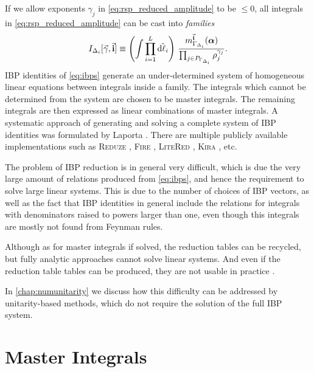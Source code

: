 If we allow exponents $\gamma_j$ in \cref{eq:rsp_reduced_amplitude} to be $\leq0$,
all integrals in \cref{eq:rsp_reduced_amplitude} can be cast into \emph{families}
\begin{equation} \label{eq:integral_families}
    I_{\Delta_i}[\va{\gamma},\va{i}] \equiv 
  \qty(\int \prod_{i=1}^{L} \tilde{\dd{\ell_i}}) ~  
  \frac{m^{\va{i}}_{\Gamma_{\Delta_i}}(\vb*{\alpha})%
    }{\prod_{j\in P_{\Gamma_{\Delta_i}}} \rho_j^{\gamma_{j}}}.
\end{equation}
IBP identities of \cref{eq:ibps} generate an under-determined system of homogeneous linear equations between integrals inside a family.
The integrals which cannot be determined from the system are chosen to be master integrals.
The remaining integrals are then expressed as linear combinations of master integrals.
A systematic approach of generating and solving a complete system of IBP identities was formulated by Laporta \cite{Laporta:2001dd}.
There are multiple publicly available implementations such as
\textsc{Reduze} \cite{Studerus:2009ye,vonManteuffel:2012np},
\textsc{Fire} \cite{Smirnov:2008iw,Smirnov:2014hma},
\textsc{LiteRed} \cite{Lee:2012cn,Lee:2013mka},
\textsc{Kira} \cite{Maierhoefer:2017hyi,Maierhofer:2018gpa}, etc.

The problem of IBP reduction is in general very difficult, which
is due the very large amount of relations produced from \cref{eq:ibps}, and
hence the requirement to solve large linear systems.
This is due to the number of choices of IBP vectors, as well as the fact that IBP identities
in general include the relations for integrals with denominators raised to powers larger than one, even
though this integrals are mostly not found from Feynman rules.

Although as for master integrals if solved, the reduction tables can be recycled, but fully analytic approaches cannot solve linear systems. 
And even if the reduction table tables can be produced, they are not usable in practice \cite{Chawdhry:2018awn}.

In \cref{chap:numunitarity} we discuss how this difficulty can be addressed by unitarity-based methods,
which do not require the solution of the full IBP system.



\section{Master Integrals}

